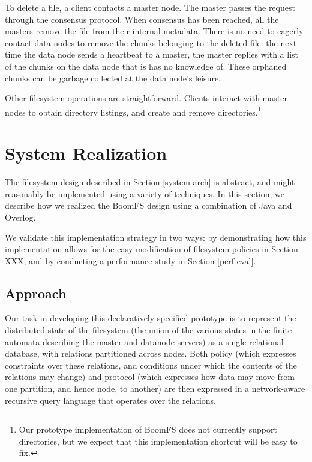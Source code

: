 \documentclass{article}
\begin{document}
To delete a file, a client contacts a master node. The master passes
the request through the consensus protocol. When consensus has been
reached, all the masters remove the file from their internal
metadata. There is no need to eagerly contact data nodes to remove the
chunks belonging to the deleted file: the next time the data node
sends a heartbeat to a master, the master replies with a list of the
chunks on the data node that is has no knowledge of. These orphaned
chunks can be garbage collected at the data node's leisure.

Other filesystem operations are straightforward. Clients interact with
master nodes to obtain directory listings, and create and remove
directories.\footnote{Our prototype implementation of BoomFS does not
  currently support directories, but we expect that this
  implementation shortcut will be easy to fix.}

\section{System Realization}
\label{system-realize}
The filesystem design described in Section \ref{system-arch} is
abstract, and might reasonably be implemented using a variety of
techniques. In this section, we describe how we realized the BoomFS
design using a combination of Java and Overlog. %

We validate this implementation strategy in two ways: by demonstrating
how this implementation allows for the easy modification of filesystem
policies in Section XXX, and by conducting a performance study in
Section \ref{perf-eval}.

\subsection{Approach}
Our task in developing this declaratively specified prototype is to
represent the distributed state of the filesystem (the union of the
various states in the finite automata describing the master and
datanode servers) as a single relational database, with relations
partitioned across nodes.  Both policy (which expresses constraints
over these relations, and conditions under which the contents of the
relations may change) and protocol (which expresses how data may move
from one partition, and hence node, to another) are then expressed in
a network-aware recursive query language that operates over the
relations.
\end{document}
